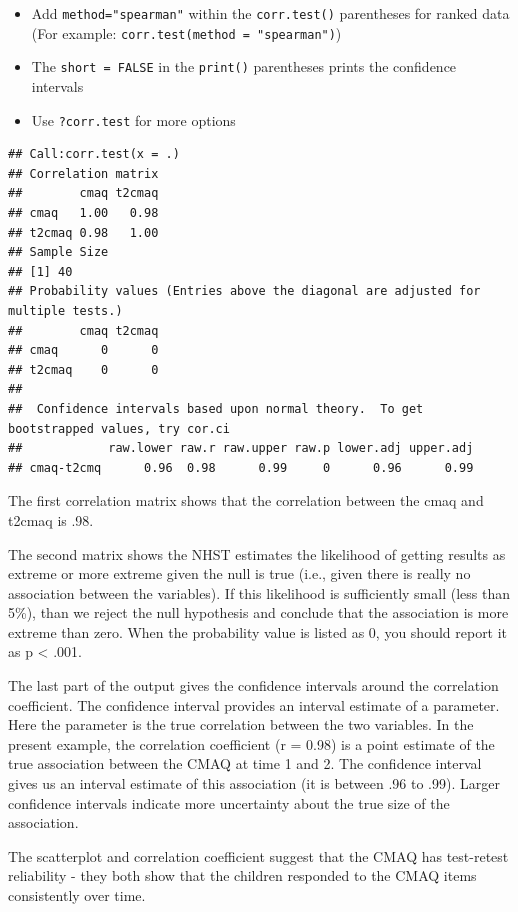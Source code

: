 \documentclass[
]{book}
\providecommand{\tightlist}{%
  \setlength{\itemsep}{0pt}\setlength{\parskip}{0pt}}
\begin{document}
\begin{itemize}
\tightlist
\item
  Add \texttt{method="spearman"} within the \texttt{corr.test()} parentheses for ranked data (For example: \texttt{corr.test(method\ =\ "spearman")})
\item
  The \texttt{short\ =\ FALSE} in the \texttt{print()} parentheses prints the confidence intervals
\item
  Use \texttt{?corr.test} for more options
\end{itemize}

\begin{verbatim}
## Call:corr.test(x = .)
## Correlation matrix 
##        cmaq t2cmaq
## cmaq   1.00   0.98
## t2cmaq 0.98   1.00
## Sample Size 
## [1] 40
## Probability values (Entries above the diagonal are adjusted for multiple tests.) 
##        cmaq t2cmaq
## cmaq      0      0
## t2cmaq    0      0
## 
##  Confidence intervals based upon normal theory.  To get bootstrapped values, try cor.ci
##            raw.lower raw.r raw.upper raw.p lower.adj upper.adj
## cmaq-t2cmq      0.96  0.98      0.99     0      0.96      0.99
\end{verbatim}

The first correlation matrix shows that the correlation between the cmaq and t2cmaq is .98.

The second matrix shows the NHST estimates the likelihood of getting results as extreme or more extreme given the null is true (i.e., given there is really no association between the variables). If this likelihood is sufficiently small (less than 5\%), than we reject the null hypothesis and conclude that the association is more extreme than zero. When the probability value is listed as 0, you should report it as p \textless{} .001.

The last part of the output gives the confidence intervals around the correlation coefficient. The confidence interval provides an interval estimate of a parameter. Here the parameter is the true correlation between the two variables. In the present example, the correlation coefficient (r = 0.98) is a point estimate of the true association between the CMAQ at time 1 and 2. The confidence interval gives us an interval estimate of this association (it is between .96 to .99). Larger confidence intervals indicate more uncertainty about the true size of the association.

The scatterplot and correlation coefficient suggest that the CMAQ has test-retest reliability - they both show that the children responded to the CMAQ items consistently over time.
\end{document}
